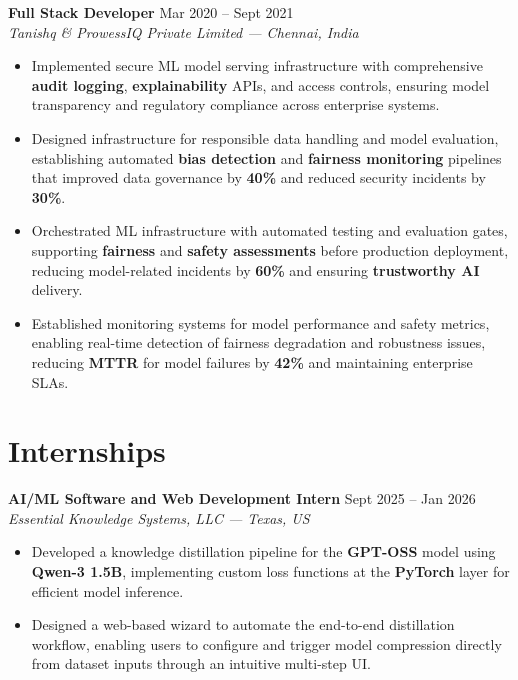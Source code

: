 \documentclass[11pt,a4paper]{article}
\newcommand{\jobentry}[3]{%
  \vspace{5pt}%
  \noindent\textbf{#1} \hfill #3\\%
  \textit{#2}%
}
\begin{document}
\jobentry{Full Stack Developer}{Tanishq \& ProwessIQ Private Limited — Chennai, India}{Mar 2020 -- Sept 2021}
\begin{itemize}
\item Implemented secure ML model serving infrastructure with comprehensive \textbf{audit logging}, \textbf{explainability} APIs, and access controls, ensuring model transparency and regulatory compliance across enterprise systems.
\item Designed infrastructure for responsible data handling and model evaluation, establishing automated \textbf{bias detection} and \textbf{fairness monitoring} pipelines that improved data governance by \textbf{40\%} and reduced security incidents by \textbf{30\%}.
\item Orchestrated ML infrastructure with automated testing and evaluation gates, supporting \textbf{fairness} and \textbf{safety assessments} before production deployment, reducing model-related incidents by \textbf{60\%} and ensuring \textbf{trustworthy AI} delivery.
\item Established monitoring systems for model performance and safety metrics, enabling real-time detection of fairness degradation and robustness issues, reducing \textbf{MTTR} for model failures by \textbf{42\%} and maintaining enterprise SLAs.
\end{itemize}

\section*{Internships}

\jobentry{AI/ML Software and Web Development Intern}{Essential Knowledge Systems, LLC — Texas, US}{Sept 2025 -- Jan 2026}
\begin{itemize}
\item Developed a knowledge distillation pipeline for the \textbf{GPT-OSS} model using \textbf{Qwen-3 1.5B}, implementing custom loss functions at the \textbf{PyTorch} layer for efficient model inference.
\item Designed a web-based wizard to automate the end-to-end distillation workflow, enabling users to configure and trigger model compression directly from dataset inputs through an intuitive multi-step UI.
\end{itemize}
\end{document}
